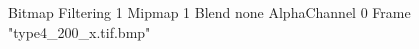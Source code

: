 {Bitmap
	{Filtering 1}
	{Mipmap 1}
	{Blend none}
	{AlphaChannel 0}
	{Frame "type4_200_x.tif.bmp"}
}
